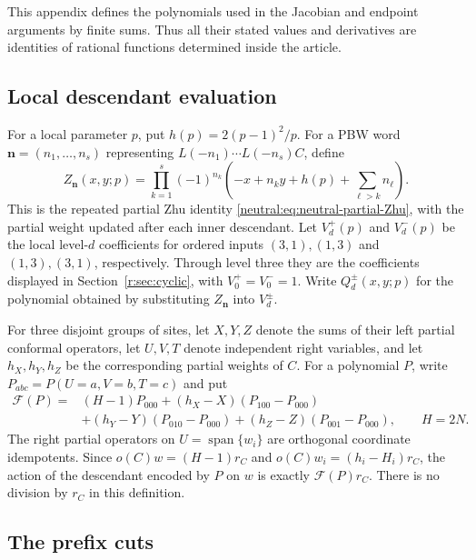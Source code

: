 \documentclass[11pt,a4paper]{article}
\numberwithin{equation}{section}
\theoremstyle{definition}\newtheorem{definition}[theorem]{Definition}
\theoremstyle{remark}\newtheorem{remark}[theorem]{Remark}
\begin{document}
This appendix defines the polynomials used in the Jacobian and
endpoint arguments by finite sums.  Thus all their stated values
and derivatives are identities of rational functions determined
inside the article.

\subsection{Local descendant evaluation}

For a local parameter $p$, put $h(p)=2(p-1)^2/p$.  For a PBW word
$\mathbf n=(n_1,\ldots,n_s)$ representing
$L(-n_1)\cdots L(-n_s)C$, define
\[
 Z_{\mathbf n}(x,y;p)
 =\prod_{k=1}^{s}(-1)^{n_k}
 \left(-x+n_ky+h(p)+\sum_{\ell>k}n_\ell\right).
\]
This is the repeated partial Zhu identity
\eqref{neutral:eq:neutral-partial-Zhu}, with the partial weight
updated after each inner descendant.  Let $V_d^+(p)$ and $V_d^-(p)$
be the local level-$d$ coefficients for ordered inputs
$(3,1),(1,3)$ and $(1,3),(3,1)$, respectively.  Through level three
they are the coefficients displayed in Section~\ref{r:sec:cyclic},
with $V_0^+=V_0^-=1$.  Write $Q_d^\pm(x,y;p)$ for the polynomial
obtained by substituting $Z_{\mathbf n}$ into $V_d^\pm$.

For three disjoint groups of sites, let $X,Y,Z$ denote the sums of
their left partial conformal operators, let $U,V,T$ denote independent
right variables, and let $h_X,h_Y,h_Z$ be the corresponding partial
weights of $C$.  For a polynomial $P$, write
$P_{abc}=P(U=a,V=b,T=c)$ and put
\begin{align*}
 \mathcal F(P)={}&(H-1)P_{000}
 +(h_X-X)(P_{100}-P_{000})\\
 &+(h_Y-Y)(P_{010}-P_{000})
 +(h_Z-Z)(P_{001}-P_{000}),\qquad H=2N.
\end{align*}
The right partial operators on $U=\operatorname{span}\{w_i\}$ are
orthogonal coordinate idempotents.  Since
$o(C)w=(H-1)r_C$ and $o(C)w_i=(h_i-H_i)r_C$, the action of the
descendant encoded by $P$ on $w$ is exactly $\mathcal F(P)r_C$.
There is no division by $r_C$ in this definition.

\subsection{The prefix cuts}
\end{document}
